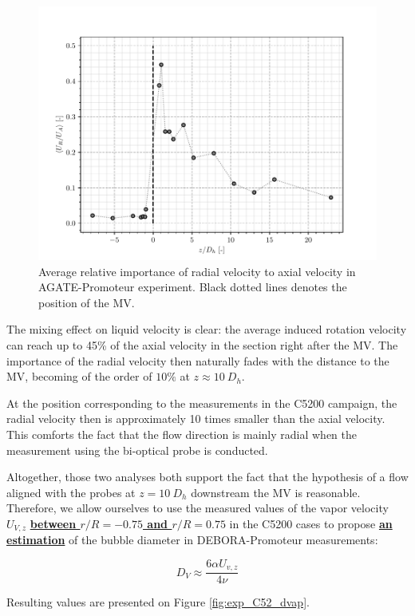 \begin{figure}[!h]
\centering
\includegraphics[width=0.6\linewidth]{img/AGATE/Urap_z.pdf}
\caption{Average relative importance of radial velocity to axial velocity in AGATE-Promoteur experiment. Black dotted lines denotes the position of the MV.}
\label{fig:exp_agate_Urap_z}
\end{figure}


\npar

The mixing effect on liquid velocity is clear: the average induced rotation velocity can reach up to 45\% of the axial velocity in the section right after the MV. The importance of the radial velocity then naturally fades with the distance to the MV, becoming of the order of $10\%$ at $z\approx 10\ D_{h}$. 

\npar

At the position corresponding to the measurements in the C5200 campaign, the radial velocity then is approximately 10 times smaller than the axial velocity. This comforts the fact that the flow direction is mainly radial when the measurement using the bi-optical probe is conducted.

\npar

Altogether, those two analyses both support the fact that the hypothesis of a flow aligned with the probes at $z=10\ D_{h}$ downstream the MV is reasonable. Therefore, we allow ourselves to use the measured values of the vapor velocity $U_{V,z}$ \textbf{\underline{between $r/R=-0.75$ and $r/R=0.75$}} in the C5200 cases to propose \textbf{\underline{an estimation}} of the bubble diameter in DEBORA-Promoteur measurements:

\begin{equation}
D_{V} \approx \frac{6 \alpha U_{v,z}}{4\nu}
\end{equation}


Resulting values are presented on Figure \ref{fig:exp_C52_dvap}.

